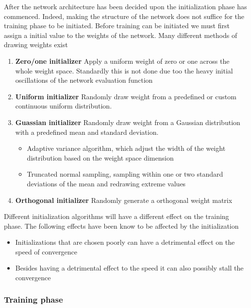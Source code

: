 \documentclass[12pt]{article}
\begin{document}
After the network architecture has been decided upon the initialization phase has commenced. Indeed, making the structure of the network does not suffice for the training phase to be initiated. Before training can be initiated we must first assign a initial value to the weights of the network. Many different methods of drawing weights exist
\begin{enumerate}
	\item \textbf{Zero/one initializer} Apply a uniform weight of zero or one across the whole weight space. Standardly this is not done due too the heavy initial oscillations of the network evaluation function
	\item \textbf{Uniform initializer} Randomly draw weight from a predefined or custom continuous uniform distribution.
	\item \textbf{Guassian initializer} Randomly draw weight from a Gaussian distribution with a predefined mean and standard deviation.
	\begin{itemize}
		\item Adaptive variance algorithm, which adjust the width of the weight distribution based on the weight space dimension
		\item Truncated normal sampling, sampling within one or two standard deviations of the mean and redrawing extreme values
	\end{itemize} 
	\item \textbf{Orthogonal initializer} Randomly generate a orthogonal weight matrix 
\end{enumerate}
Different initialization algorithms will have a different effect on the training phase. The following effects have been know to be affected by the initialization \cite{Sutskever2013} \cite{Kumar}
\begin{itemize}
	\item Initializations that are chosen poorly can have a detrimental effect on the speed of convergence
	\item Besides having a detrimental effect to the speed it can also possibly stall the convergence
\end{itemize}

\subsubsection{Training phase}
\end{document}
